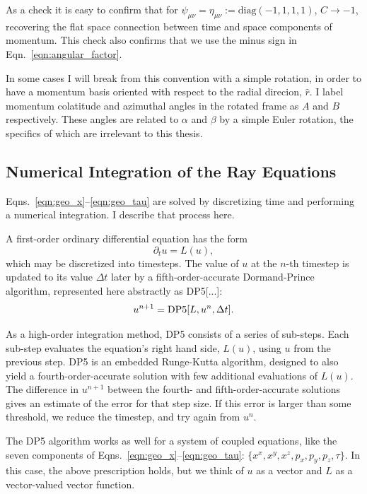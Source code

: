 As a check it is easy to confirm that for
$\psi_{\mu \nu}=\eta_{\mu \nu}:=\text{diag}(-1,1,1,1)$,
$C \rightarrow -1$, recovering the flat space connection between time and space
components of momentum. This check also confirms that we use the minus sign in
Eqn.~\ref{eqn:angular_factor}.

In some cases I will break from this convention with a simple rotation, in order
to have a momentum basis oriented with respect to the radial direcion, $\hat{r}$.
I label momentum colatitude and azimuthal angles in the rotated frame as $A$
and $B$ respectively. These angles are related to $\alpha$ and $\beta$ by a
simple Euler rotation, the specifics of which are irrelevant to this thesis.

\subsection{Numerical Integration of the Ray Equations}
\label{ssec:timestepping}
Eqns.~\ref{eqn:geo_x}--\ref{eqn:geo_tau} are solved by discretizing time and
performing a numerical integration.
I describe that process here.

A first-order ordinary differential equation has the form
\begin{equation}
  \partial_t u = L(u),
\end{equation}
which may be discretized into timesteps.
The value of $u$ at the $n$-th timestep is updated to its value
$\Delta t$ later by a fifth-order-accurate Dormand-Prince algorithm,
represented here abstractly as DP5[...]:
\begin{equation}
  u^{n+1} = {\rm DP5}[L,u^n,\Delta t].
\end{equation}

As a high-order integration method, DP5 consists of a series of sub-steps.
Each sub-step evaluates the equation's right hand side, $L(u)$, using $u$ from
the previous step.
DP5 is an embedded Runge-Kutta algorithm, designed to also yield
a fourth-order-accurate solution with few additional evaluations of $L(u)$.
The difference in $u^{n+1}$ between the fourth- and fifth-order-accurate
solutions gives an estimate of the error for that step size. If this error is
larger than some threshold, we reduce the timestep, and try again from $u^n$.

The DP5 algorithm works as well for a system of coupled equations,
like the seven components of Eqns.~\ref{eqn:geo_x}--\ref{eqn:geo_tau}:
$\{x^x,x^y,x^z,p_x,p_y,p_z,\tau\}$.
In this case, the above prescription holds, but we think of $u$ as a
vector and $L$ as a vector-valued vector function.

